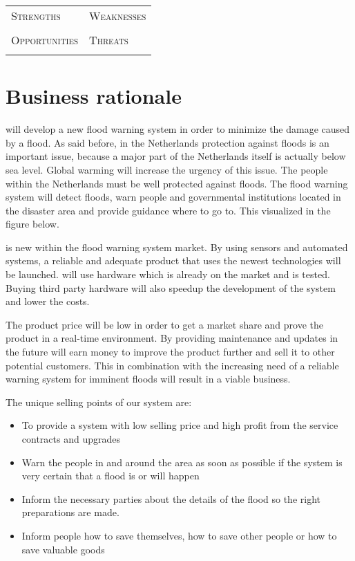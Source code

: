 \begin{tabular}{L{} | L{}}
	\toprule
	\textsc{\Large Strengths} & \textsc{\Large Weaknesses} \\
	 \Strengths &   \Weaknesses \\
	\midrule
	\textsc{\Large Opportunities} & \textsc{\Large Threats} \\
	 \Opportunities &  \Threats \\
\end{tabular}

%

\section{Business rationale}
\CompanyName{} will develop a new flood warning system in order to minimize the damage caused by a flood. As said before, in the Netherlands protection against floods is an important issue, because a major part of the Netherlands itself is actually below sea level. Global warming will increase the urgency of this issue. The people within the Netherlands must be well protected against floods. The flood warning system will detect floods, warn people and governmental institutions located in the disaster area and provide guidance where to go to. This visualized in the figure below.

\CompanyName{} is new within the flood warning system market. By using sensors and automated systems, a reliable and adequate product that uses the newest technologies will be launched. \CompanyName{} will use hardware which is already on the market and is tested. Buying third party hardware will also speedup the development of the system and lower the costs.

The product price will be low in order to get a market share and prove the product in a real-time environment. By providing maintenance and updates in the future \CompanyName{} will earn money to improve the product further and sell it to other potential customers. This in combination with the increasing need of a reliable warning system for imminent floods will result in a viable business.


The unique selling points of our system are: 
\begin{itemize}
	\item To provide a system with low selling price and high profit from the service contracts and upgrades
	\item Warn the people in and around the area as soon as possible if the system is very certain that a flood is or will happen
	\item Inform the necessary parties about the details of the flood so the right preparations are made. 
	\item Inform people how to save themselves, how to save other people or how to save valuable goods
\end{itemize}

